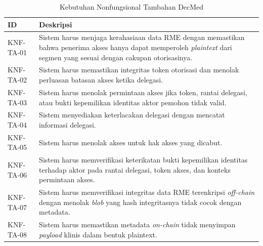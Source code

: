 \documentclass[bahasa, 12pt, a4paper, onecolumn, oneside, final]{report}
\begin{document}
\begin{table}[!ht]
	\centering
	\caption{Kebutuhan Nonfungsional Tambahan DecMed}
	\label{tab:kebutuhan-nonfungsional-tambahan-decmed}
	\small
	\begin{tabular}{|p{2cm}|p{10.5cm}|}
		\hline
		\textbf{ID} & \textbf{Deskripsi}                                                                                                                                                              \\
		\hline
		KNF-TA-01   & Sistem harus menjaga kerahasiaan data RME dengan memastikan bahwa penerima akses hanya dapat memperoleh \textit{plaintext} dari segmen yang sesuai dengan cakupan otorisasinya. \\ \hline
		KNF-TA-02   & Sistem harus memastikan integritas token otorisasi dan menolak perluasan batasan akses ketika delegasi.                                                                         \\ \hline
		KNF-TA-03   & Sistem harus menolak permintaan akses jika token, rantai delegasi, atau bukti kepemilikan identitas aktor pemohon tidak valid.                                                  \\ \hline
		KNF-TA-04   & Sistem menyediakan keterlacakan delegasi dengan mencatat informasi delegasi.                                                                                                    \\ \hline
		KNF-TA-05   & Sistem harus menolak akses untuk hak akses yang dicabut.                                                                                                                        \\ \hline
		KNF-TA-06   & Sistem harus memverifikasi keterikatan bukti kepemilikan identitas terhadap aktor pada rantai delegasi, token akses, dan konteks permintaan akses.                              \\ \hline
		KNF-TA-07   & Sistem harus memverifikasi integritas data RME terenkripsi \textit{off-chain} dengan menolak \textit{blob} yang hash integritasnya tidak cocok dengan metadata.                 \\ \hline
		KNF-TA-08   & Sistem harus memastikan metadata \textit{on-chain} tidak menyimpan \textit{payload} klinis dalam bentuk plaintext.                                                              \\ \hline
	\end{tabular}
\end{table}
\FloatBarrier
\end{document}
